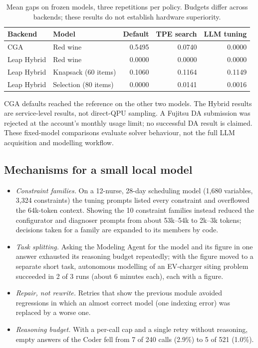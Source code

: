 \begin{table}[t]
\centering\small
\caption{Mean gaps on frozen models, three repetitions per policy. Budgets differ across backends;
these results do not establish hardware superiority.}
\label{tab:backendkeyresults}
\begin{tabular}{@{}llrrr@{}}
\toprule
Backend & Model & Default & TPE search & LLM tuning \\
\midrule
CGA & Red wine & 0.5495 & 0.0740 & 0.0000 \\
Leap Hybrid & Red wine & 0.0000 & 0.0000 & 0.0000 \\
Leap Hybrid & Knapsack (60 items) & 0.1060 & 0.1164 & 0.1149 \\
Leap Hybrid & Selection (80 items) & 0.0000 & 0.0141 & 0.0016 \\
\bottomrule
\end{tabular}
\end{table}

CGA defaults reached the reference on the other two models. The Hybrid results are service-level results,
not direct-QPU sampling. A Fujitsu DA submission was rejected at the account's monthly usage limit;
no successful DA result is claimed. These fixed-model comparisons evaluate solver behaviour, not the full
LLM acquisition and modelling workflow.

\subsection{Mechanisms for a small local model}
\label{sec:mechanisms}
\begin{itemize}
  \item \emph{Constraint families.} On a 12-nurse, 28-day scheduling model (1{,}680 variables, 3{,}324
        constraints) the tuning prompts listed every constraint and overflowed the 64k-token context. Showing the
        10 constraint families instead reduced the configurator and diagnoser prompts from about 53k--54k to
        2k--3k tokens; decisions taken for a family are expanded to its members by code.
  \item \emph{Task splitting.} Asking the Modeling Agent for the model and its figure in one answer exhausted its
        reasoning budget repeatedly; with the figure moved to a separate short task, autonomous modelling of an
        EV-charger siting problem succeeded in 2 of 3 runs (about 6 minutes each), each with a figure.
  \item \emph{Repair, not rewrite.} Retries that show the previous module avoided regressions in which an almost
        correct model (one indexing error) was replaced by a worse one.
  \item \emph{Reasoning budget.} With a per-call cap and a single retry without reasoning, empty answers of the
        Coder fell from 7 of 240 calls (2.9\%) to 5 of 521 (1.0\%).
\end{itemize}


